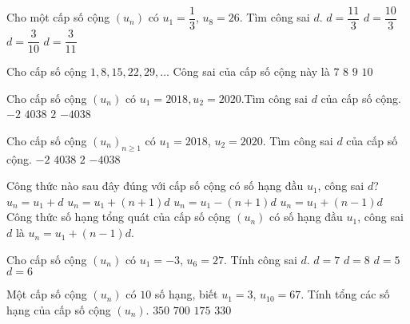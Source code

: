 \begin{ex}%
	Cho một cấp số cộng $(u_n)$ có $u_1= \dfrac{1}{3}$, $u_8= 26$. Tìm công sai $d$.
	\choice
	{\True $d= \dfrac{11}{3}$}
	{$d= \dfrac{10}{3}$}
	{$d= \dfrac{3}{10}$}
	{$d= \dfrac{3}{11}$}
\end{ex}%
\begin{ex}%
		Cho cấp số cộng $1,8,15,22,29,\ldots$ Công sai của cấp số cộng này là 
		\choice
		{\True $7$}
		{$8$}
		{$9$}
		{$10$}
	\end{ex}%
\begin{ex}%
	Cho cấp số cộng $(u_n)$ có $u_1=2018, u_2=2020$.Tìm công sai $d$ của cấp số cộng.
	\choice
	{$-2$}
	{$4038$}
	{\True $2$}
	{$-4038$}
	\end{ex}%
\begin{ex}%
Cho cấp số cộng $\left(u_n\right)_{n\geq 1}$ có $u_1=2018$, $u_2=2020$. Tìm công sai $d$ của cấp số cộng.
\choice
{$-2$}
{$4038$}
{\True $2$}
{$-4038$}
\end{ex}%
\begin{ex}%
 Công thức nào sau đây đúng với cấp số cộng có số hạng đầu $u_1$, công sai $d$?
 \choice
  {$u_n=u_1+d$}
  {$u_n=u_1+(n+1)d$}
  {$u_n=u_1-(n+1)d$}
  {\True $u_n=u_1+(n-1)d$}
 \loigiai
  {
  Công thức số hạng tổng quát của cấp số cộng $(u_n)$ có số hạng đầu $u_1$, công sai $d$ là $u_n=u_1+(n-1)d$.
  }
\end{ex}%
\begin{ex}%
	Cho cấp số cộng $\left(u_n\right)$ có $u_1=-3$, $u_6=27$. Tính công sai $d$.
	\choice
	{$d=7$}
	{$d=8$}
	{$d=5$}
	{\True $d=6$}
\end{ex}%
\begin{ex}%
	Một cấp số cộng $ (u_n) $ có $ 10 $ số hạng, biết $ u_1=3 $, $ u_{10}=67 $. Tính tổng các số hạng của cấp số cộng $ (u_n) $.	
	\choice
	{\True $ 350 $}
	{$ 700 $}
	{$ 175 $}
	{$ 330 $}
\end{ex}%
